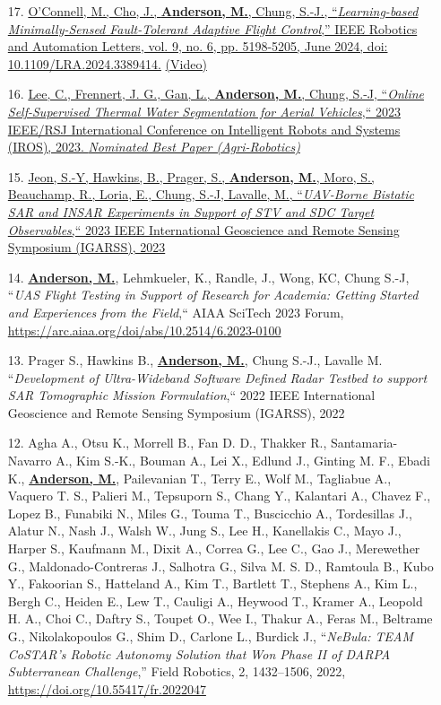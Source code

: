 \documentclass[12pt,letter,sans]{moderncv}        %
\begin{document}
\begin{itemize}
    \item [17.] \href{https://ieeexplore.ieee.org/document/10502204}{O’Connell, M., Cho, J., \underline{\textbf{Anderson, M.}}, Chung, S.-J., ``\textit{Learning-based Minimally-Sensed Fault-Tolerant Adaptive Flight Control},'' IEEE Robotics and Automation Letters, vol. 9, no. 6, pp. 5198-5205, June 2024, doi: 10.1109/LRA.2024.3389414.} \href{https://www.youtube.com/watch?v=IzFFEcvQiXw}{(Video)}
    
	\item[16.] \href{https://ieeexplore.ieee.org/document/10342016}
	{Lee, C., Frennert, J. G., Gan, L., \underline{\textbf{Anderson, M.}}, Chung, S.-J, ``\textit{Online Self-Supervised Thermal Water Segmentation for Aerial Vehicles},`` 2023 IEEE/RSJ International Conference on Intelligent Robots and Systems (IROS), 2023. \textit{Nominated Best Paper (Agri-Robotics)}}
	
	\item[15.] \href{https://ieeexplore.ieee.org/document/10282077}
	{Jeon, S.-Y, Hawkins, B., Prager, S., \underline{\textbf{Anderson, M.}}, Moro, S., Beauchamp, R., Loria, E., Chung, S.-J, Lavalle, M., ``\textit{UAV-Borne Bistatic SAR and INSAR Experiments in Support of STV and SDC Target Observables},`` 2023 IEEE International Geoscience and Remote Sensing Symposium (IGARSS), 2023}
	    
    \item [14.] \underline{\textbf{Anderson, M.}}, Lehmkueler, K., Randle, J., Wong, KC, Chung S.-J, ``\textit{UAS Flight Testing in Support of Research for Academia: Getting Started and Experiences from the Field},`` AIAA SciTech 2023 Forum, \url{https://arc.aiaa.org/doi/abs/10.2514/6.2023-0100}
    
    \item [13.] Prager S., Hawkins B., \underline{\textbf{Anderson, M.}}, Chung S.-J., Lavalle M. ``\textit{Development of Ultra-Wideband Software Defined Radar Testbed to support SAR Tomographic Mission Formulation},`` 2022 IEEE International Geoscience and Remote Sensing Symposium (IGARSS), 2022
    
    \item [12.] Agha A., Otsu K., Morrell B., Fan D. D., Thakker R., Santamaria-Navarro A., Kim S.-K., Bouman A., Lei X., Edlund J., Ginting M. F., Ebadi K., \underline{\textbf{Anderson, M.}}, Pailevanian T., Terry E., Wolf M., Tagliabue A., Vaquero T. S., Palieri M., Tepsuporn S., Chang Y., Kalantari A., Chavez F., Lopez B., Funabiki N., Miles G., Touma T., Buscicchio A., Tordesillas J., Alatur N., Nash J., Walsh W., Jung S., Lee H., Kanellakis C., Mayo J., Harper S., Kaufmann M., Dixit A., Correa G., Lee C., Gao J., Merewether G., Maldonado-Contreras J., Salhotra G., Silva M. S. D., Ramtoula B., Kubo Y., Fakoorian S., Hatteland A., Kim T., Bartlett T., Stephens A., Kim L., Bergh C., Heiden E., Lew T., Cauligi A., Heywood T., Kramer A., Leopold H. A., Choi C., Daftry S., Toupet O., Wee I., Thakur A., Feras M., Beltrame G., Nikolakopoulos G., Shim D., Carlone L., Burdick J., ``\textit{NeBula: TEAM CoSTAR’s Robotic Autonomy Solution that Won Phase II of DARPA Subterranean Challenge},'' Field Robotics, 2, 1432–1506, 2022, \url{https://doi.org/10.55417/fr.2022047}
    

\end{itemize}
\end{document}
